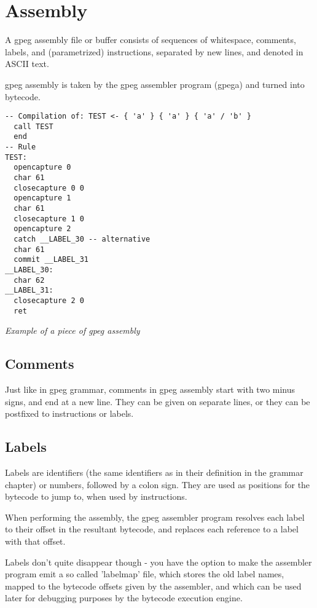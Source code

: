 \section{Assembly}
\label{sec:assembly}

A gpeg assembly file or buffer consists of sequences of
whitespace, comments, labels, and (parametrized) instructions, separated
by new lines, and denoted in ASCII text.

gpeg assembly is taken by the gpeg assembler program (gpega) and turned
into bytecode.

\begin{myquote}
\begin{verbatim}
-- Compilation of: TEST <- { 'a' } { 'a' } { 'a' / 'b' }
  call TEST
  end
-- Rule
TEST:
  opencapture 0
  char 61
  closecapture 0 0
  opencapture 1
  char 61
  closecapture 1 0
  opencapture 2
  catch __LABEL_30 -- alternative
  char 61
  commit __LABEL_31
__LABEL_30:
  char 62
__LABEL_31:
  closecapture 2 0
  ret
\end{verbatim}
\end{myquote}
\textit{Example of a piece of gpeg assembly}

\subsection{Comments}

Just like in gpeg grammar,
comments in gpeg assembly start with two minus signs, and end at
a new line. They can be given on separate lines, or they can be
postfixed to instructions or labels.

\subsection{Labels}

Labels are identifiers (the same identifiers as in their definition
in the grammar chapter) or numbers, followed by a colon sign. They are used
as positions for the bytecode to jump to, when used by instructions.

When performing the assembly, the gpeg assembler program resolves
each label to their offset in the resultant bytecode, and replaces each
reference to a label with that offset.

Labels don't quite disappear though - you have the option to make the
assembler program emit a so called 'labelmap' file, which stores the old
label names, mapped to the bytecode offsets given by the assembler,
and which can be used later
for debugging purposes by the bytecode execution engine.

